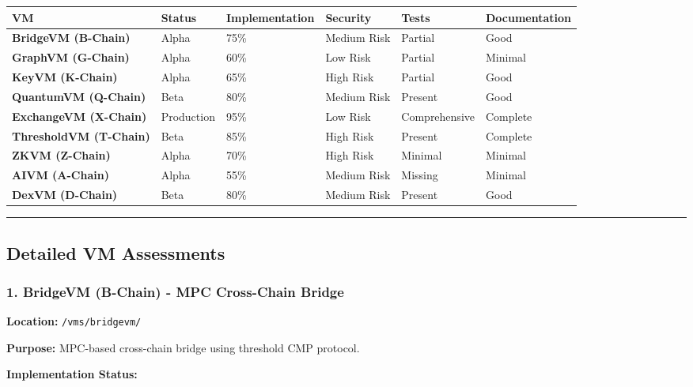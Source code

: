 \documentclass[
]{article}
\newcounter{none} %
\begin{document}
{\def\LTcaptype{none} %
\begin{longtable}[]{@{}llllll@{}}
\toprule\noalign{}
VM & Status & Implementation & Security & Tests & Documentation \\
\midrule\noalign{}
\endhead
\bottomrule\noalign{}
\endlastfoot
\textbf{BridgeVM (B-Chain)} & Alpha & 75\% & Medium Risk & Partial &
Good \\
\textbf{GraphVM (G-Chain)} & Alpha & 60\% & Low Risk & Partial &
Minimal \\
\textbf{KeyVM (K-Chain)} & Alpha & 65\% & High Risk & Partial & Good \\
\textbf{QuantumVM (Q-Chain)} & Beta & 80\% & Medium Risk & Present &
Good \\
\textbf{ExchangeVM (X-Chain)} & Production & 95\% & Low Risk &
Comprehensive & Complete \\
\textbf{ThresholdVM (T-Chain)} & Beta & 85\% & High Risk & Present &
Complete \\
\textbf{ZKVM (Z-Chain)} & Alpha & 70\% & High Risk & Minimal &
Minimal \\
\textbf{AIVM (A-Chain)} & Alpha & 55\% & Medium Risk & Missing &
Minimal \\
\textbf{DexVM (D-Chain)} & Beta & 80\% & Medium Risk & Present & Good \\
\end{longtable}
}

\begin{center}\rule{0.5\linewidth}{0.5pt}\end{center}

\subsection{Detailed VM Assessments}\label{detailed-vm-assessments}

\subsubsection{1. BridgeVM (B-Chain) - MPC Cross-Chain
Bridge}\label{1-bridgevm-b-chain---mpc-cross-chain-bridge}

\textbf{Location:} \texttt{/vms/bridgevm/}

\textbf{Purpose:} MPC-based cross-chain bridge using threshold CMP
protocol.

\textbf{Implementation Status:}
\end{document}
